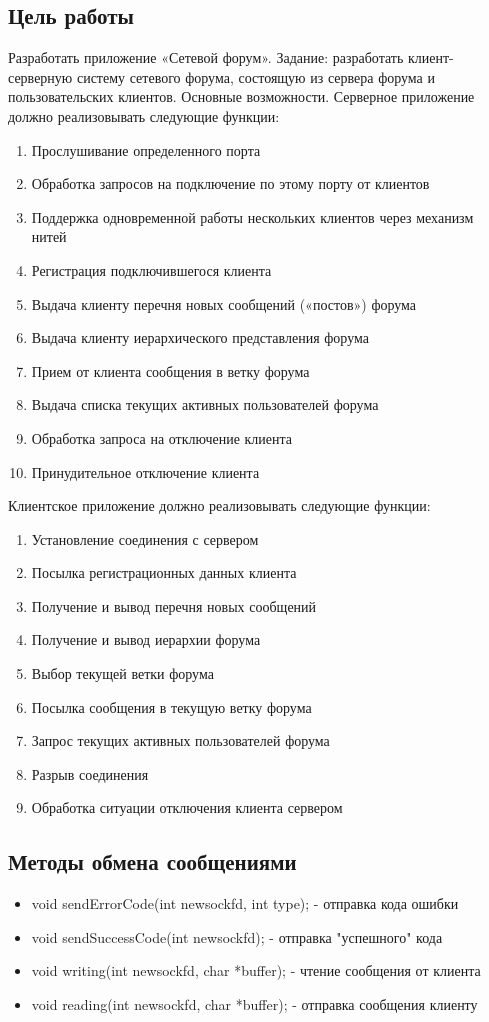 \documentclass[a4paper,12pt]{extarticle}
\begin{document}
\subsection{Цель работы}
Разработать приложение «Сетевой форум».
Задание: разработать клиент-серверную систему сетевого форума, состоящую из сервера форума и пользовательских клиентов.
Основные возможности. Серверное приложение должно реализовывать следующие функции:
\begin{enumerate}
\item Прослушивание определенного порта
\item Обработка запросов на подключение по этому порту от клиентов
\item Поддержка одновременной работы нескольких клиентов через механизм нитей
\item Регистрация подключившегося клиента
\item Выдача клиенту перечня новых сообщений («постов») форума
\item Выдача клиенту иерархического представления форума
\item Прием от клиента сообщения в ветку форума
\item Выдача списка текущих активных пользователей форума
\item Обработка запроса на отключение клиента
\item Принудительное отключение клиента
\end{enumerate}
Клиентское приложение должно реализовывать следующие функции:
\begin{enumerate}
\item Установление соединения с сервером
\item Посылка регистрационных данных клиента
\item Получение и вывод перечня новых сообщений
\item Получение и вывод иерархии форума
\item Выбор текущей ветки форума
\item Посылка сообщения в текущую ветку форума
\item Запрос текущих активных пользователей форума
\item Разрыв соединения
\item Обработка ситуации отключения клиента сервером
\end{enumerate}

\subsection{Методы обмена сообщениями}
\begin{itemize}
\item void sendErrorCode(int newsockfd, int type); - отправка кода ошибки
\item void sendSuccessCode(int newsockfd); - отправка "успешного" кода
\item void writing(int newsockfd, char *buffer); - чтение сообщения от клиента
\item void reading(int newsockfd, char *buffer); - отправка сообщения клиенту

\end{itemize}
\end{document}
